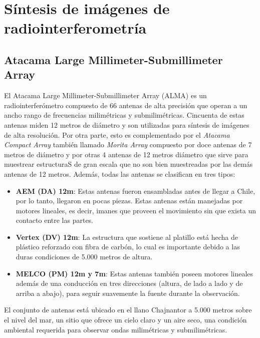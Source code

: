 \chapter{Síntesis de imágenes de radiointerferometría}
\label{cap:imagesynthesisinterferometry}

\section{Atacama Large Millimeter-Submillimeter Array}

El Atacama Large Millimeter-Submillimeter Array (ALMA) es un radiointerferómetro compuesto de 66 antenas de alta precisión que operan a un ancho rango de frecuencias milimétricas y submilimétricas. Cincuenta de estas antenas miden 12 metros de diámetro y son utilizadas para síntesis de imágenes de alta resolución. Por otra parte, esto es complementado por el \textit{Atacama Compact Array} también llamado \textit{Morita Array} compuesto por doce antenas de 7 metros de diámetro y por otras 4 antenas de 12 metros diámetro que sirve para muestrear estructuraS de gran escala que no son bien muestreadas por las demás antenas de 12 metros. Además, todas las antenas se clasifican en tres tipos:

\begin{itemize}
	\item \textbf{AEM (DA) 12m}: Estas antenas fueron ensambladas antes de llegar a Chile, por lo tanto, llegaron en pocas piezas. Estas antenas están manejadas por motores lineales, es decir, imanes que proveen el movimiento sin que exista un contacto entre las partes.
	\item \textbf{Vertex (DV) 12m}: La estructura que sostiene al platillo está hecha de plástico reforzado con fibra de carbón, lo cual es importante debido a las duras condiciones de 5.000 metros de altura.
	\item \textbf{MELCO (PM) 12m y 7m}: Estas antenas también poseen motores lineales además de una conducción en tres direcciones (altura, de lado a lado y de arriba a abajo), para seguir suavemente la fuente durante la observación.
\end{itemize}

El conjunto de antenas está ubicado en el llano Chajnantor a 5.000 metros sobre el nivel del mar, un sitio que ofrece un cielo claro y un aire seco, una condición ambiental requerida para observar ondas milimétricas y submilimétricas.

